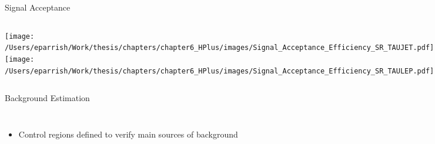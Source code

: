\documentclass[aspectratio=169,xcolor=table]{beamer}
\begin{document}
  \begin{frame}[c]{Signal Acceptance}
    \begin{columns}[c]
      \texttt{[image: /Users/eparrish/Work/thesis/chapters/chapter6\_HPlus/images/Signal\_Acceptance\_Efficiency\_SR\_TAUJET.pdf]}
      \texttt{[image: /Users/eparrish/Work/thesis/chapters/chapter6\_HPlus/images/Signal\_Acceptance\_Efficiency\_SR\_TAULEP.pdf]}
    \end{columns}
  \end{frame}

  \begin{frame}[t]{Background Estimation}
    \begin{columns}
        \begin{itemize}
          \item Control regions defined to verify main sources of background
        \end{itemize}
    \begin{table}[!thp]
    \end{table}



\end{columns}
\end{frame}
\end{document}
